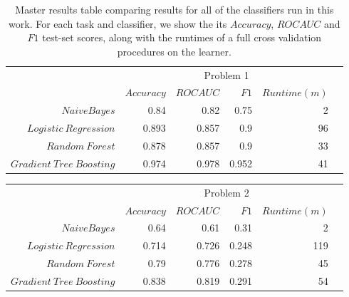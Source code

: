 
	\begin{table*}\centering
		\caption{Master results table comparing results for all of the classifiers run in this work.
			For each task and classifier, we show the its $Accuracy$, $ROC AUC$ and $F1$ test-set scores, along with the runtimes of a full cross validation procedures on the learner.}\label{tab:master_table_results}
		\begin{tabular}{@{}rrrrrc@{}} \toprule
			&  \multicolumn{4}{c}{Problem 1} \\
			\cmidrule{2-5}
			& $Accuracy$ & $ROC AUC$ & $F1$ & $Runtime  (m)$ \\ \midrule
			$Naive Bayes$               & 0.84  & 0.82  & 0.75  & 2  \\
			$Logistic \ Regression$     & 0.893 & 0.857 & 0.9   & 96\\
			$Random \ Forest$            & 0.878 & 0.857 & 0.9  & 33 \\
			$Gradient \ Tree \ Boosting$ & 0.974 & 0.978 & 0.952 & 41  \\

			\bottomrule
		\end{tabular}
	\end{table*}


\medskip

	\begin{table*}\centering
		\begin{tabular}{@{}rrrrrc@{}} \toprule
			&  \multicolumn{4}{c}{Problem 2} \\
			\cmidrule{2-5}
			& $Accuracy$ & $ROC AUC$ & $F1$ & $Runtime  (m)$ \\ \midrule
			$Naive Bayes$               & 0.64  & 0.61  & 0.31  & 2   \\
			$Logistic \ Regression$     & 0.714 & 0.726 & 0.248 & 119 \\
			$Random \ Forest$            & 0.79  & 0.776 & 0.278 & 45  \\
			$Gradient \ Tree \ Boosting$ & 0.838 & 0.819 & 0.291 & 54 \\

			\bottomrule
		\end{tabular}
	\end{table*}


\medskip

